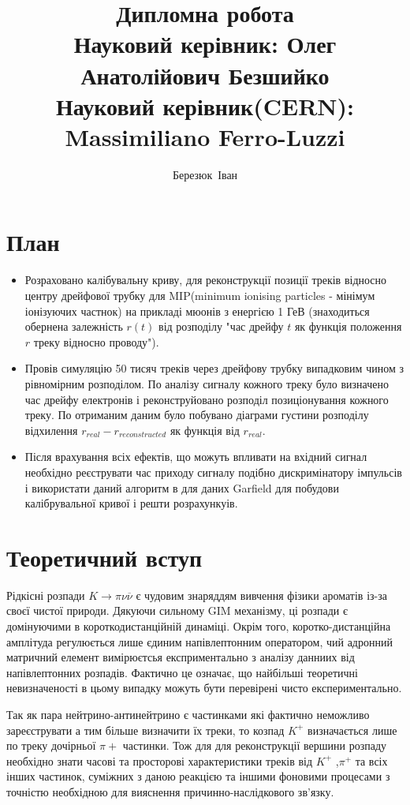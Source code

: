 \documentclass[]{article}
\author{Березюк~Іван}
\title{ Дипломна робота \\
		Науковий керівник: Олег Анатолійович Безшийко \\
		Науковий керівник(CERN): Massimiliano Ferro-Luzzi\\
		}
\begin{document}
	 \linenumbers
	\maketitle
	\newpage
	\section{План}
	\begin{itemize}
		\item Розраховано калібувальну криву, для реконструкції позиції треків відносно центру дрейфової трубку для MIP(minimum ionising particles - мінімум іонізуючих частнок) на прикладі мюонів з енергією 1 ГеВ (знаходиться обернена залежність $r(t)$ від розподілу "час дрейфу $t$ як функція положення $r$ треку відносно проводу").\par
		\item Провів симуляцію 50 тисяч треків через дрейфову трубку випадковим чином з рівномірним розподілом. По аналізу сигналу кожного треку було визначено час дрейфу електронів і реконструйовано розподіл позиціонування кожного треку. По отриманим даним було побувано діаграми густини розподілу відхилення $r_{real} - r_{reconstructed}$ як функція від $r_{real}$.
	
		\item Після врахування всіх ефектів, що можуть впливати на вхідний сигнал необхідно реєструвати час приходу сигналу подібно дискримінатору імпульсів і використати даний алгоритм в для даних Garfield для побудови калібрувальної кривої і решти розрахункуів.
	\end{itemize}

	\newpage
	\section{Теоретичний вступ}
		Рідкісні розпади $ K \rightarrow \pi\nu \overline{\nu} $ є чудовим знаряддям вивчення фізики ароматів із-за своєї чистої природи. Дякуючи сильному GIM механізму, ці розпади є домінуючими в короткодистанційній динаміці. Окрім того, коротко-дистанційна амплітуда регулюється лише єдиним напівлептонним оператором, чий адронний матричний елемент вимірюєтсья експриментально з аналізу данниих від напівлептонних розпадів. Фактично це означає, що найбільші теоретичні невизначеності в цьому випадку можуть бути перевірені чисто експериментально.
		
		Так як пара нейтрино-антинейтрино є частинками які фактично неможливо зареєструвати а тим більше визначити їх треки, то козпад $K^+$ визначається лише по треку дочірньої $\pi+$ частинки. Тож для для реконструкції вершини розпаду необхідно знати часові та просторові характеристики треків від $K^+$ ,$\pi^+$ та всіх інших частинок, суміжних з даною реакцією та іншими фоновими процесами з точністю необхідною для вияснення причинно-наслідкового зв’язку.
		
\end{document}
